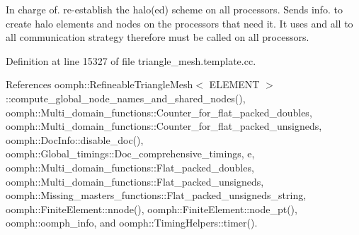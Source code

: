 In charge of. re-\/establish the halo(ed) scheme on all processors. Sends info. to create halo elements and nodes on the processors that need it. It uses and all to all communication strategy therefore must be called on all processors. 



Definition at line 15327 of file triangle\+\_\+mesh.\+template.\+cc.



References oomph\+::\+Refineable\+Triangle\+Mesh$<$ E\+L\+E\+M\+E\+N\+T $>$\+::compute\+\_\+global\+\_\+node\+\_\+names\+\_\+and\+\_\+shared\+\_\+nodes(), oomph\+::\+Multi\+\_\+domain\+\_\+functions\+::\+Counter\+\_\+for\+\_\+flat\+\_\+packed\+\_\+doubles, oomph\+::\+Multi\+\_\+domain\+\_\+functions\+::\+Counter\+\_\+for\+\_\+flat\+\_\+packed\+\_\+unsigneds, oomph\+::\+Doc\+Info\+::disable\+\_\+doc(), oomph\+::\+Global\+\_\+timings\+::\+Doc\+\_\+comprehensive\+\_\+timings, e, oomph\+::\+Multi\+\_\+domain\+\_\+functions\+::\+Flat\+\_\+packed\+\_\+doubles, oomph\+::\+Multi\+\_\+domain\+\_\+functions\+::\+Flat\+\_\+packed\+\_\+unsigneds, oomph\+::\+Missing\+\_\+masters\+\_\+functions\+::\+Flat\+\_\+packed\+\_\+unsigneds\+\_\+string, oomph\+::\+Finite\+Element\+::nnode(), oomph\+::\+Finite\+Element\+::node\+\_\+pt(), oomph\+::oomph\+\_\+info, and oomph\+::\+Timing\+Helpers\+::timer().

\mbox{\label{classoomph_1_1RefineableTriangleMesh_a604ab6d1fc1c54e1255845da75f8dc6d}} 
